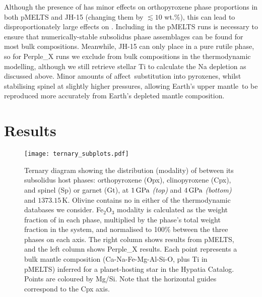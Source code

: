 Although the presence of  has minor effects on orthopyroxene phase proportions in both pMELTS and JH-15 (changing them by $\lesssim10$ wt.\%), this can lead to disproportionately large effects on \fo. Including  in the pMELTS runs is necessary to ensure that numerically-stable subsolidus phase assemblages can be found for most bulk compositions. Meanwhile, JH-15 can only place  in a pure rutile phase, so for Perple\_X runs we exclude  from bulk compositions in the thermodynamic modelling, although we still retrieve stellar Ti to calculate the Na depletion as discussed above. Minor amounts of  affect \ferric\,substitution into pyroxenes, whilst stabilising spinel at slightly higher pressures, allowing Earth's upper mantle \fo\,to be reproduced more accurately from Earth's depleted mantle composition.












\section{Results}
\label{sec:results}


\begin{figure*}
\centering
\texttt{[image: ternary\_subplots.pdf]}
\caption[Ternary diagram showing the distribution of  between its subsolidus host phases.]{\label{fig:ferric_ternary}Ternary diagram showing the distribution (modality) of  between its subsolidus host phases: orthopyroxene (Opx), clinopyroxene (Cpx), and spinel (Sp) or garnet (Gt), at $1\,{\rm GPa}$ \textit{(top)} and $4\,{\rm GPa}$ \textit{(bottom)} and $1373.15\,\text{K}$. Olivine contains no  in either of the thermodynamic databases we consider. Fe$_2$O$_3$ modality is calculated as the weight fraction of  in each phase, multiplied by the phase's total weight fraction in the system, and normalised to 100\% between the three phases on each axis. The right column shows results from pMELTS, and the left column shows Perple\_X results. Each point represents a bulk mantle composition (Ca-Na-Fe-Mg-Al-Si-O, plus Ti in pMELTS) inferred for a planet-hosting star in the Hypatia Catalog. Points are coloured by Mg/Si. Note that the horizontal guides correspond to the Cpx axis.}
\end{figure*}


